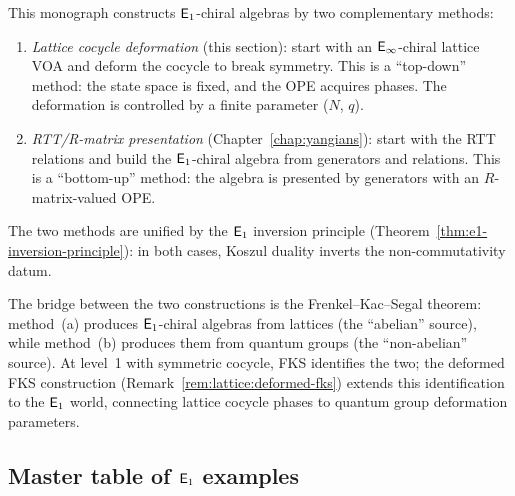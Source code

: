 \begin{remark}
\label{rem:two-e1-methods}
This monograph constructs $\mathsf{E}_1$-chiral algebras by two
complementary methods:
\begin{enumerate}[label=\textup{(\alph*)}]
\item \emph{Lattice cocycle deformation}
  (this section): start with an $\mathsf{E}_{\infty}$-chiral lattice VOA and
  deform the cocycle to break symmetry.  This is a ``top-down''
  method: the state space is fixed, and the OPE acquires phases.
  The deformation is controlled by a finite parameter ($N$, $q$).
\item \emph{RTT/R-matrix presentation}
  (Chapter~\ref{chap:yangians}): start with the RTT relations and
  build the $\mathsf{E}_1$-chiral algebra from generators and relations.
  This is a ``bottom-up'' method: the algebra is presented by
  generators with an $R$-matrix-valued OPE.
\end{enumerate}
The two methods are unified by the $\mathsf{E}_1$ inversion principle
(Theorem~\ref{thm:e1-inversion-principle}): in both cases, Koszul
duality inverts the non-commutativity datum.

The bridge between the two constructions is the Frenkel--Kac--Segal
theorem: method~(a) produces $\mathsf{E}_1$-chiral algebras from lattices
(the ``abelian'' source), while method~(b) produces them from
quantum groups (the ``non-abelian'' source).  At level~1 with
symmetric cocycle, FKS identifies the two; the deformed FKS
construction (Remark~\ref{rem:lattice:deformed-fks}) extends this
identification to the $\mathsf{E}_1$ world, connecting lattice cocycle
phases to quantum group deformation parameters.
\end{remark}


\subsection{Master table of $\mathsf{E}_1$ examples}

